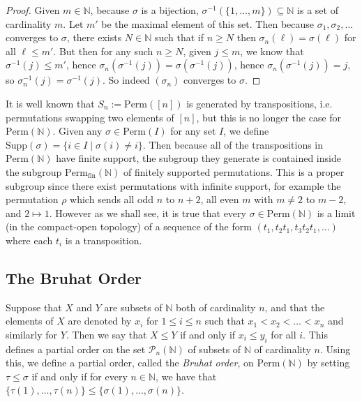 \documentclass[oneside,11pt]{amsart}
\newcommand{\nn}{\ensuremath{\mathbb{N}}}
\newcommand{\mP}{\ensuremath{\mathcal{P}}}
\newcommand{\Perm}{\ensuremath{\text{Perm}}}
\newcommand{\Supp}{\ensuremath{\text{Supp}}}
\newcommand{\fin}{\ensuremath{\text{fin}}}
\theoremstyle{definition}
\newtheorem{proof techniques}{Proof Techniques}
\begin{document}
\begin{proof}
Given $m \in \nn$, because $\sigma$ is a bijection, $\sigma^{-1}( \{ 1, \ldots, m \} ) \subseteq \nn$ is a set of cardinality $m$. Let $m'$ be the maximal element of this set. Then because $\sigma_1, \sigma_2, \ldots$ converges to $\sigma$, there exists $N \in \nn$ such that if $n \geq N$ then $\sigma_n(\ell) = \sigma(\ell)$ for all $\ell \leq m'$. But then for any such $n \geq N$, given $j \leq m$, we know that $\sigma^{-1}(j) \leq m'$, hence $\sigma_n(\sigma^{-1}(j)) = \sigma(\sigma^{-1}(j))$, hence $\sigma_n(\sigma^{-1}(j)) = j$, so $\sigma^{-1}_n(j) = \sigma^{-1}(j)$. So indeed $(\sigma_n)$ converges to $\sigma$. 
\end{proof}


It is well known that $S_n := \Perm([n])$ is generated by transpositions, i.e. permutations swapping two elements of $[n]$, but this is no longer the case for $\Perm(\nn)$. Given any $\sigma \in \Perm(I)$ for any set $I$, we define $\Supp(\sigma) = \{ i \in I \mid \sigma(i) \neq i \}$. Then because all of the transpositions in $\Perm(\nn)$ have finite support, the subgroup they generate is contained inside the subgroup $\Perm_\fin(\nn)$ of finitely supported permutations. This is a proper subgroup since there exist permutations with infinite support, for example the permutation $\rho$ which sends all odd $n$ to $n + 2$, all even $m$ with $m \neq 2$ to $m - 2$, and $2 \mapsto 1$. However as we shall see, it is true that every $\sigma \in \Perm(\nn)$ is a limit (in the compact-open topology) of a sequence of the form $( t_1 , t_2 t_1, t_3 t_2 t_1 , \ldots )$ where each $t_i$ is a transposition.



\subsection{The Bruhat Order} 


Suppose that $X$ and $Y$ are subsets of $\nn$ both of cardinality $n$, and that the elements of $X$ are denoted by $x_i$ for $1 \leq i \leq n$ such that $x_1 < x_2 < \ldots < x_n$ and similarly for $Y$. Then we say that $X \leq Y$ if and only if $x_i \leq y_i$ for all $i$. This defines a partial order on the set $\mP_n(\nn)$ of subsets of $\nn$ of cardinality $n$. Using this, we define a partial order, called the \emph{Bruhat order}, on $\Perm(\nn)$ by setting $\tau \leq \sigma$ if and only if for every $n \in \nn$, we have that $\{ \tau(1) , \ldots, \tau(n) \} \leq \{ \sigma(1), \ldots, \sigma(n) \}$. 
\end{document}
